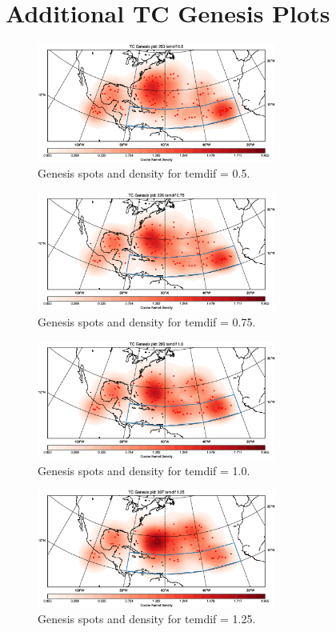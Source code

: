 \chapter{Additional TC Genesis Plots}\label{sec:genesis-appendix}

\begin{figure}[ht]
	\centering
	\includegraphics[width=0.7\textwidth]{img/genesis_plot_temdif05.eps}
	\caption{Genesis spots and density for temdif = 0.5.}
\end{figure}
\begin{figure}[ht]
	\centering
	\includegraphics[width=0.7\textwidth]{img/genesis_plot_temdif075.eps}
	\caption{Genesis spots and density for temdif = 0.75.}
\end{figure}
\begin{figure}[ht]
	\centering
	\includegraphics[width=0.7\textwidth]{img/genesis_plot_temdif1.eps}
	\caption{Genesis spots and density for temdif = 1.0.}
\end{figure}
\begin{figure}[ht]
	\centering
	\includegraphics[width=0.7\textwidth]{img/genesis_plot_temdif125.eps}
	\caption{Genesis spots and density for temdif = 1.25.}
\end{figure}
